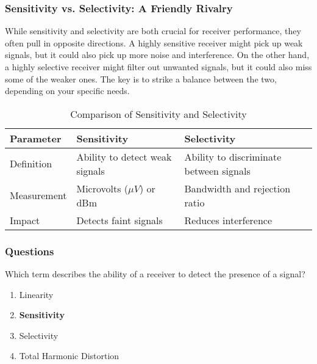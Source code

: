 \subsubsection*{Sensitivity vs. Selectivity: A Friendly Rivalry}
While sensitivity and selectivity are both crucial for receiver performance, they often pull in opposite directions. A highly sensitive receiver might pick up weak signals, but it could also pick up more noise and interference. On the other hand, a highly selective receiver might filter out unwanted signals, but it could also miss some of the weaker ones. The key is to strike a balance between the two, depending on your specific needs.



\begin{table}[h]
    \centering
    \begin{tabular}{|l|l|l|}
        \hline
        \textbf{Parameter} & \textbf{Sensitivity} & \textbf{Selectivity} \\
        \hline
        Definition & Ability to detect weak signals & Ability to discriminate between signals \\
        \hline
        Measurement & Microvolts ($\mu V$) or dBm & Bandwidth and rejection ratio \\
        \hline
        Impact & Detects faint signals & Reduces interference \\
        \hline
    \end{tabular}
    \caption{Comparison of Sensitivity and Selectivity}
    \label{tab:sensitivity-selectivity}
\end{table}

\subsubsection*{Questions}

\begin{tcolorbox}[colback=gray!10!white,colframe=black!75!black,title={T7A01}]
    Which term describes the ability of a receiver to detect the presence of a signal?
    \begin{enumerate}[label=\Alph*),noitemsep]
        \item Linearity
        \item \textbf{Sensitivity}
        \item Selectivity
        \item Total Harmonic Distortion
    \end{enumerate}
\end{tcolorbox}

